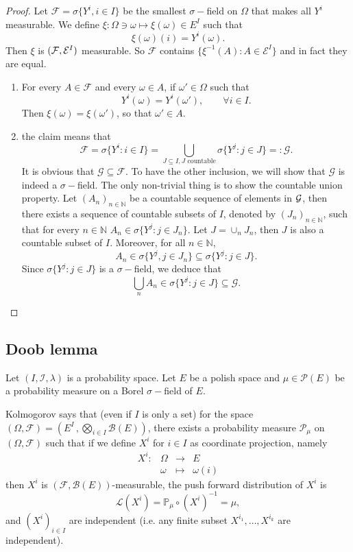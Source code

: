 \begin{proof}
	Let $\mathcal{F}= \sigma\{ Y^i, i \in I \}$ be the smallest $\sigma-$field on $\Omega$ that makes all $Y^i$ measurable. We define $\xi : \Omega \ni \omega \mapsto \xi(\omega) \in E^I$ such that
	$$
	\xi(\omega)(i) = Y^i(\omega).
	$$
 	Then $\xi$ is $({\cal F}, {\cal E}^I)$ measurable. So $\mathcal{F}$ contains $\{\xi^{-1}(A): A \in \mathcal{E}^I\}$ and in fact they are equal.
	
	\begin{enumerate}
		\item 
		For every $A \in \mathcal{F}$ and every $\omega \in A$, if $\omega' \in \Omega$ such that
		$$
			Y^i(\omega) = Y^i(\omega'), \qquad \forall i \in I.
		$$
		Then $\xi(\omega) = \xi(\omega')$, so that $\omega' \in A$.
		\item the claim means that 
		$$ \mathcal{F}= \sigma\{Y^i: i \in I\} = \bigcup_{J \subseteq I, J \text{ countable}} \sigma\{Y^j: j \in J\} =: \mathcal{G}.$$
		It is obvious that $\mathcal{G} \subseteq \mathcal{F}$. To have the other inclusion, we will show that $\mathcal{G}$ is indeed a $\sigma-$field. The only non-trivial thing is to show the countable union property. Let $(A_n)_{n \in \mathbb{N}}$ be a countable sequence of elements in ${\cal G}$, then there exists a sequence of countable subsets of $I$, denoted by $(J_n)_{n\in \mathbb{N}}$, such that for every $n\in \mathbb{N}$  $A_n \in \sigma\{Y^j: j \in J_n\}$. Let $J = \cup_{n} J_n$, then $J$ is also a countable subset of $I$. Moreover, for all $n \in \mathbb{N}$, 
		$$
			A_n \in \sigma\{Y^j, j\in J_n\}  \subseteq \sigma\{Y^j: j \in J\}.
		$$
		Since $\sigma\{Y^j: j \in J\}$ is a $\sigma-$field, we deduce that
		$$
			\bigcup_n A_n \in \sigma\{ Y^j:  j \in J \} \subseteq \mathcal{G}.
		$$
	\end{enumerate}
\end{proof}


\subsection{Doob lemma}

Let $(I, \mathcal{I}, \lambda)$ is a probability space. Let $E$ be a polish space and $\mu \in \mathcal{P}(E)$ be a probability measure on a Borel $\sigma-$field of $E$. 

Kolmogorov says that (even if $I$ is only a set) for the space $(\Omega, \mathcal{F}) = (E^I \, , \bigotimes_{i \in I} \mathcal{B}(E) )$, there exists a probability measure $\mathcal{P}_\mu$ on $(\Omega, \mathcal{F})$ such that
if we define $X^i$ for $i \in I$ as coordinate projection, namely 
\begin{equation*}
	\begin{array}{rrcl}
			X^i : & \Omega &\longrightarrow & E\\
				  &	\omega &\mapsto  &\omega(i)
	\end{array}
\end{equation*}
then $X^i$ is $(\mathcal{F}, \mathcal{B}(E))$-measurable, the push forward distribution of $X^i$ is $$
\mathcal{L}(X^i) = \mathbb{P_\mu} \circ (X^i)^{-1} = \mu,
$$ 
and $(X^i)_{i \in I}$ are independent (i.e. any finite subset $X^{i_1}, \ldots, X^{i_k}$ are independent).


